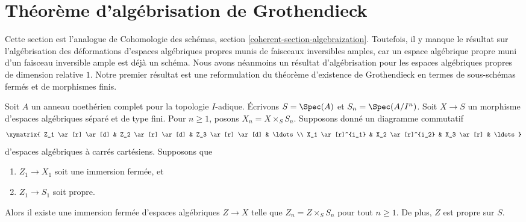\section{Théorème d'algébrisation de Grothendieck}
\label{section-algebraization}

\noindent
Cette section est l'analogue de
Cohomologie des schémas, section \ref{coherent-section-algebraization}.
Toutefois, il y manque le résultat sur l'algébrisation des déformations
d'espaces algébriques propres munis de faisceaux inversibles amples, car un
espace algébrique propre muni d'un faisceau inversible ample est
déjà un schéma. Nous avons néanmoins un résultat d'algébrisation pour les
espaces algébriques propres de dimension relative $1$.
Notre premier résultat est une reformulation du théorème d'existence de Grothendieck
en termes de sous-schémas fermés et de morphismes finis.

\begin{lemma}
\label{lemma-algebraize-formal-closed-subscheme}
Soit $A$ un anneau noethérien complet pour la topologie $I$-adique.
Écrivons $S = \Spec(A)$ et $S_n = \Spec(A/I^n)$.
Soit $X \to S$ un morphisme d'espaces algébriques séparé
et de type fini.
Pour $n \geq 1$, posons $X_n = X \times_S S_n$.
Supposons donné un diagramme commutatif
$$
\xymatrix{
Z_1 \ar[r] \ar[d] & Z_2 \ar[r] \ar[d] & Z_3 \ar[r] \ar[d] & \ldots \\
X_1 \ar[r]^{i_1} & X_2 \ar[r]^{i_2} & X_3 \ar[r] & \ldots
}
$$
d'espaces algébriques à carrés cartésiens. Supposons que
\begin{enumerate}
\item $Z_1 \to X_1$ soit une immersion fermée, et
\item $Z_1 \to S_1$ soit propre.
\end{enumerate}
Alors il existe une immersion fermée d'espaces algébriques $Z \to X$ telle que
$Z_n = Z \times_S S_n$ pour tout $n \geq 1$. De plus, $Z$ est propre sur $S$.
\end{lemma}

